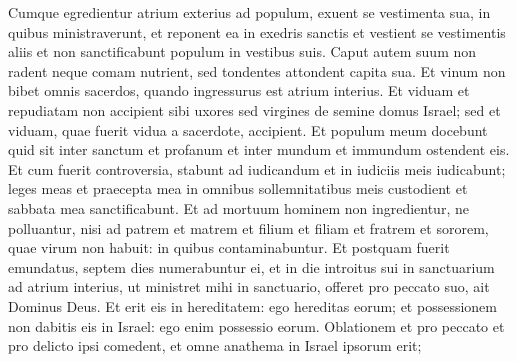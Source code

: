 \begin{biblechapter}
\begin{biblechapter}
\begin{biblechapter}
\begin{biblechapter}
\begin{biblechapter}
\begin{biblechapter}
\begin{biblechapter}
\begin{biblechapter}
\begin{biblechapter}
\begin{biblechapter}
\begin{biblechapter}
\begin{biblechapter}
\begin{biblechapter}
\begin{biblechapter}
\begin{biblechapter}
\begin{biblechapter}
\begin{biblechapter}
\begin{biblechapter}
\begin{biblechapter}
\begin{biblechapter}
\begin{biblechapter}
\begin{biblechapter}
\begin{biblechapter}
\begin{biblechapter}
\begin{biblechapter}
\begin{biblechapter}
\begin{biblechapter}
\begin{biblechapter}
\begin{biblechapter}
\begin{biblechapter}
\begin{biblechapter}
\begin{biblechapter}
\begin{biblechapter}
\begin{biblechapter}
\begin{biblechapter}
\begin{biblechapter}
\begin{biblechapter}
\begin{biblechapter}
\begin{biblechapter}
\begin{biblechapter}
\begin{biblechapter}
\begin{biblechapter}
\begin{biblechapter}
\begin{biblechapter}
\verse Cumque egredientur atrium exterius ad populum, exuent se vestimenta sua, in quibus ministraverunt, et reponent ea in exedris sanctis et vestient se vestimentis aliis et non sanctificabunt populum in vestibus suis. 
\verse Caput autem suum non radent neque comam nutrient, sed tondentes attondent capita sua. 
\verse Et vinum non bibet omnis sacerdos, quando ingressurus est atrium interius. 
\verse Et viduam et repudiatam non accipient sibi uxores sed virgines de semine domus Israel; sed et viduam, quae fuerit vidua a sacerdote, accipient. 
\verse Et populum meum docebunt quid sit inter sanctum et profanum et inter mundum et immundum ostendent eis. 
\verse Et cum fuerit controversia, stabunt ad iudicandum et in iudiciis meis iudicabunt; leges meas et praecepta mea in omnibus sollemnitatibus meis custodient et sabbata mea sanctificabunt. 
\verse Et ad mortuum hominem non ingredientur, ne polluantur, nisi ad patrem et matrem et filium et filiam et fratrem et sororem, quae virum non habuit: in quibus contaminabuntur. 
\verse Et postquam fuerit emundatus, septem dies numerabuntur ei, 
\verse et in die introitus sui in sanctuarium ad atrium interius, ut ministret mihi in sanctuario, offeret pro peccato suo, ait Dominus Deus. 
\verse Et erit eis in hereditatem: ego hereditas eorum; et possessionem non dabitis eis in Israel: ego enim possessio eorum. 
\verse Oblationem et pro peccato et pro delicto ipsi comedent, et omne anathema in Israel ipsorum erit; 

\end{biblechapter}
\end{biblechapter}
\end{biblechapter}
\end{biblechapter}
\end{biblechapter}
\end{biblechapter}
\end{biblechapter}
\end{biblechapter}
\end{biblechapter}
\end{biblechapter}
\end{biblechapter}
\end{biblechapter}
\end{biblechapter}
\end{biblechapter}
\end{biblechapter}
\end{biblechapter}
\end{biblechapter}
\end{biblechapter}
\end{biblechapter}
\end{biblechapter}
\end{biblechapter}
\end{biblechapter}
\end{biblechapter}
\end{biblechapter}
\end{biblechapter}
\end{biblechapter}
\end{biblechapter}
\end{biblechapter}
\end{biblechapter}
\end{biblechapter}
\end{biblechapter}
\end{biblechapter}
\end{biblechapter}
\end{biblechapter}
\end{biblechapter}
\end{biblechapter}
\end{biblechapter}
\end{biblechapter}
\end{biblechapter}
\end{biblechapter}
\end{biblechapter}
\end{biblechapter}
\end{biblechapter}
\end{biblechapter}
